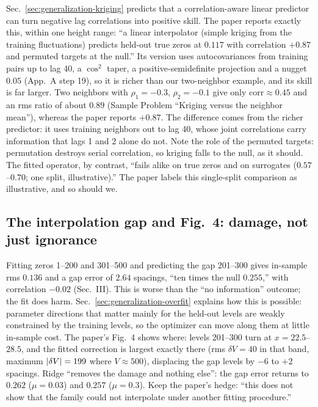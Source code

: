 Sec.~\ref{sec:generalization-kriging} predicts that a correlation-aware linear predictor can turn negative lag correlations into positive skill. The paper reports exactly this, within one height range: ``a linear interpolator (simple kriging from the training fluctuations) predicts held-out true zeros at $0.117$ with correlation $+0.87$ and permuted targets at the null.'' Its version uses autocovariances from training pairs up to lag 40, a $\cos^2$ taper, a positive-semidefinite projection and a nugget $0.05$ (App.~A step 19), so it is richer than our two-neighbor example, and its skill is far larger. Two neighbors with $\rho_1=-0.3$, $\rho_2=-0.1$ give only $\mathrm{corr}\approx0.45$ and an rms ratio of about $0.89$ (Sample Problem ``Kriging versus the neighbor mean''), whereas the paper reports $+0.87$. The difference comes from the richer predictor: it uses training neighbors out to lag 40, whose joint correlations carry information that lags 1 and 2 alone do not. Note the role of the permuted targets: permutation destroys serial correlation, so kriging falls to the null, as it should. The fitted operator, by contrast, ``fails alike on true zeros and on surrogates ($0.57$--$0.70$; one split, illustrative).'' The paper labels this single-split comparison as illustrative, and so should we.

\subsection{The interpolation gap and Fig.~4: damage, not just ignorance}

Fitting zeros 1--200 and 301--500 and predicting the gap 201--300 gives in-sample rms $0.136$ and a gap error of $2.64$ spacings, ``ten times the null $0.255$,'' with correlation $-0.02$ (Sec.~III). This is worse than the ``no information'' outcome; the fit does harm. Sec.~\ref{sec:generalization-overfit} explains how this is possible: parameter directions that matter mainly for the held-out levels are weakly constrained by the training levels, so the optimizer can move along them at little in-sample cost. The paper's Fig.~4 shows where: levels 201--300 turn at $x=22.5$--$28.5$, and the fitted correction is largest exactly there (rms $\delta V=40$ in that band, maximum $\left\lvert \delta V\right\rvert=199$ where $V\approx500$), displacing the gap levels by $-6$ to $+2$ spacings. Ridge ``removes the damage and nothing else'': the gap error returns to $0.262$ ($\mu=0.03$) and $0.257$ ($\mu=0.3$). Keep the paper's hedge: ``this does not show that the family could not interpolate under another fitting procedure.''

